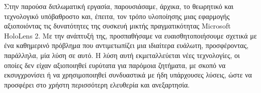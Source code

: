 Στην παρούσα διπλωματική εργασία, παρουσιάσαμε, άρχικα, το θεωρητικό και τεχνολογικό υπόβαθροστο και, έπειτα, τον τρόπο υλοποίησης μιας εφαρμογής αξιοποιόντας τις δυνατότητες της συσκευή μικτής πραγματικότητας Microsoft HoloLens 2. Με την ανάπτυξή της, προσπαθήσαμε να ευαισθητοποιήσουμε σχετικά με ένα καθημερινό πρόβλημα που αντιμετωπίζει μια ιδιαίτερα ευάλωτη, προσφέροντας, παράλληλα, μία λύση σε αυτό. Η λύση αυτή εκμεταλλεύεται νέες τεχνολογίες, οι οποίες δεν είχαν αξιοποιηθεί ευρύτατα για παρόμοια ζητήματα, με σκοπό να εκσυγχρονίσει ή να χρησιμοποιηθεί συνδυαστικά με ήδη υπάρχουσες λύσεις, ώστε να προσφέρει στο χρήστη περισσότερη ελευθερία και ανεξαρτησία.  